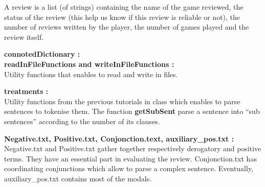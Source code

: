 \documentclass[paper=a4,fontsize=12pt]{report}
\begin{document}
A review is a list (of strings) containing  the name of the game reviewed, the status of the review (this help us know if this review is reliable or not), the number of reviews written by the player, the number of games played and the review itself. 

\textbf{connotedDictionary :} \\

\textbf{readInFileFunctions and writeInFileFunctions :} \\
Utility functions that enables to read and write in files. 

\textbf{treatments :} \\  
Utility functions from the previous tutorials in class which enables to parse sentences to tokenise them. The function \textbf{getSubSent} parse a sentence into "`sub sentences"' according to the number of its clauses.

\textbf{Negative.txt, Positive.txt, Conjonction.text, auxiliary\_pos.txt :} \\
Negative.txt and Positive.txt gather together respectively derogatory and positive terms. They have an essential part in evaluating the review. Conjonction.txt has coordinating conjunctions which allow to parse a complex sentence. Eventually, auxiliary\_pos.txt contains most of the modals. 
\end{document}
